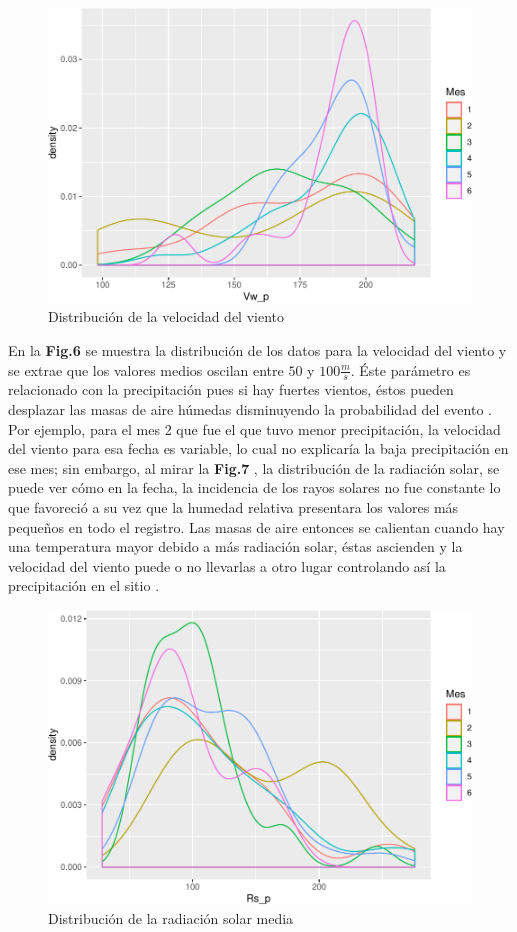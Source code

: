 \documentclass[conference,final,]{IEEEtran}
\makeatletter
\def\maxwidth{\ifdim\Gin@nat@width>\linewidth\linewidth
\else\Gin@nat@width\fi}
\let\Oldincludegraphics\includegraphics
\renewcommand{\includegraphics}[1]{\Oldincludegraphics[width=\maxwidth]{#1}}
\makeatother
\begin{document}
\begin{figure}
\centering
\includegraphics{Hidrology_files/figure-latex/unnamed-chunk-11-1.pdf}
\caption{Distribución de la velocidad del viento}
\end{figure}

En la \textbf{Fig.6} se muestra la distribución de los datos para la
velocidad del viento y se extrae que los valores medios oscilan entre
\(50\) y \(100 \frac{m}{s}\). Éste parámetro es relacionado con la
precipitación pues si hay fuertes vientos, éstos pueden desplazar las
masas de aire húmedas disminuyendo la probabilidad del evento
\cite{tobon}. Por ejemplo, para el mes 2 que fue el que tuvo menor
precipitación, la velocidad del viento para esa fecha es variable, lo
cual no explicaría la baja precipitación en ese mes; sin embargo, al
mirar la \textbf{Fig.7} , la distribución de la radiación solar, se
puede ver cómo en la fecha, la incidencia de los rayos solares no fue
constante lo que favoreció a su vez que la humedad relativa presentara
los valores más pequeños en todo el registro. Las masas de aire entonces
se calientan cuando hay una temperatura mayor debido a más radiación
solar, éstas ascienden y la velocidad del viento puede o no llevarlas a
otro lugar controlando así la precipitación en el sitio \cite{tobon}.

\begin{figure}
\centering
\includegraphics{Hidrology_files/figure-latex/unnamed-chunk-14-1.pdf}
\caption{Distribución de la radiación solar media}
\end{figure}
\end{document}
